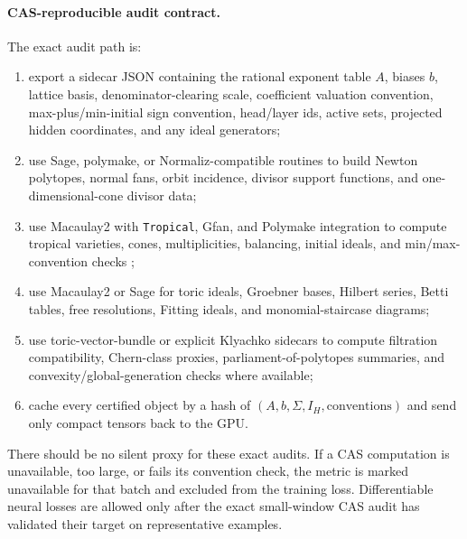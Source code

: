 \documentclass[11pt]{article}
\theoremstyle{definition}
\theoremstyle{plain}
\theoremstyle{remark}
\numberwithin{equation}{section}
\begin{document}
\paragraph{CAS-reproducible audit contract.}
The exact audit path is:
\begin{enumerate}[leftmargin=2em]
  \item export a sidecar JSON containing the rational exponent table $A$, biases $b$, lattice basis, denominator-clearing scale, coefficient valuation convention, max-plus/min-initial sign convention, head/layer ids, active sets, projected hidden coordinates, and any ideal generators;
  \item use Sage, polymake, or Normaliz-compatible routines to build Newton polytopes, normal fans, orbit incidence, divisor support functions, and one-dimensional-cone divisor data;
  \item use Macaulay2 with \texttt{Tropical}, Gfan, and Polymake integration to compute tropical varieties, cones, multiplicities, balancing, initial ideals, and min/max-convention checks \cite{m2tropical2019};
  \item use Macaulay2 or Sage for toric ideals, Groebner bases, Hilbert series, Betti tables, free resolutions, Fitting ideals, and monomial-staircase diagrams;
  \item use toric-vector-bundle or explicit Klyachko sidecars to compute filtration compatibility, Chern-class proxies, parliament-of-polytopes summaries, and convexity/global-generation checks where available;
  \item cache every certified object by a hash of $(A,b,\Sigma,I_H,\text{conventions})$ and send only compact tensors back to the GPU.
\end{enumerate}
There should be no silent proxy for these exact audits.  If a CAS computation is unavailable, too large, or fails its convention check, the metric is marked unavailable for that batch and excluded from the training loss.  Differentiable neural losses are allowed only after the exact small-window CAS audit has validated their target on representative examples.
\end{document}

